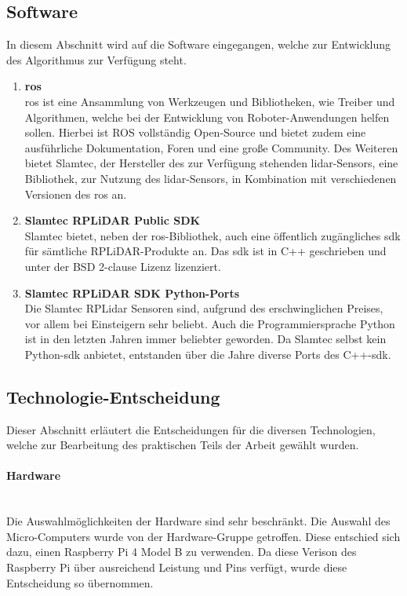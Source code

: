 \newpage
\subsection{Software}
In diesem Abschnitt wird auf die Software eingegangen, welche zur Entwicklung des Algorithmus zur Verfügung steht.

\begin{enumerate}[leftmargin=*]
    \item \textbf{\acf{ros}} \\
    \ac{ros} ist eine Ansammlung von Werkzeugen und Bibliotheken, wie Treiber und Algorithmen, welche bei der Entwicklung von Roboter-Anwendungen helfen sollen. 
    Hierbei ist ROS vollständig Open-Source und bietet zudem eine ausführliche Dokumentation, Foren und eine große Community. \cite{Ros2024}
    Des Weiteren bietet Slamtec, der Hersteller des zur Verfügung stehenden \ac{lidar}-Sensors, eine Bibliothek, zur Nutzung des \ac{lidar}-Sensors, in Kombination mit verschiedenen Versionen des \ac{ros} an. \cite{RplidarRos2023}

    \item \textbf{Slamtec RPLiDAR Public SDK} \\
    Slamtec bietet, neben der \ac{ros}-Bibliothek, auch eine öffentlich zugängliches \ac{sdk} für sämtliche RPLiDAR-Produkte an. 
    Das \ac{sdk} ist in C++ geschrieben und unter der BSD 2-clause Lizenz lizenziert. \cite{RplidarSDK2023}

    \item \textbf{Slamtec RPLiDAR SDK Python-Ports} \\
    Die Slamtec RPLidar Sensoren sind, aufgrund des erschwinglichen Preises, vor allem bei Einsteigern sehr beliebt.
    Auch die Programmiersprache Python ist in den letzten Jahren immer beliebter geworden.
    Da Slamtec selbst kein Python-\ac{sdk} anbietet, entstanden über die Jahre diverse Ports des C++-\ac{sdk}.
\end{enumerate}

\subsection{Technologie-Entscheidung}
Dieser Abschnitt erläutert die Entscheidungen für die diversen Technologien, welche zur Bearbeitung des praktischen Teils der Arbeit gewählt wurden.

\paragraph{Hardware} \mbox{}\\
Die Auswahlmöglichkeiten der Hardware sind sehr beschränkt.
Die Auswahl des Micro-Computers wurde von der Hardware-Gruppe getroffen.
Diese entschied sich dazu, einen Raspberry Pi 4 Model B zu verwenden.
Da diese Verison des Raspberry Pi über ausreichend Leistung und Pins verfügt,
wurde diese Entscheidung so übernommen.

